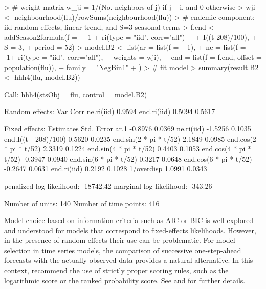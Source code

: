\documentclass[a4paper,11pt]{article}
\begin{document}
\begin{Schunk}
\begin{Sinput}
> # weight matrix w_ji = 1/(No. neighbors of j) if j ~ i, and 0 otherwise
> wji <- neighbourhood(flu)/rowSums(neighbourhood(flu))
> # endemic component: iid random effects, linear trend, and S=3 seasonal terms
> f.end <- addSeason2formula(f = ~ -1 + ri(type = "iid", corr="all") + 
+                                 I((t-208)/100), 
+                                 S = 3, 
+                                 period = 52)
> model.B2 <- list(ar = list(f = ~ 1),
+                  ne = list(f = ~ -1+ ri(type = "iid", corr="all"), 
+                            weights = wji),
+                  end = list(f = f.end, offset = population(flu)),
+                  family = "NegBin1"
+                  )
> # fit model
> summary(result.B2 <- hhh4(flu, model.B2))
\end{Sinput}
\end{Schunk}
\begin{Schunk}
\begin{Soutput}
Call: 
hhh4(stsObj = flu, control = model.B2)

Random effects: 
            Var    Corr   
ne.ri(iid)  0.9594        
end.ri(iid) 0.5094 0.5617 

Fixed effects: 
                        Estimates  Std. Error
ar.1                      -0.8976      0.0369
ne.ri(iid)                -1.5256      0.1035
end.I((t - 208)/100)       0.5620      0.0235
end.sin(2 * pi * t/52)     2.1849      0.0985
end.cos(2 * pi * t/52)     2.3319      0.1224
end.sin(4 * pi * t/52)     0.4403      0.1053
end.cos(4 * pi * t/52)    -0.3947      0.0940
end.sin(6 * pi * t/52)     0.3217      0.0648
end.cos(6 * pi * t/52)    -0.2647      0.0631
end.ri(iid)                0.2192      0.1028
1/overdisp                 1.0991      0.0343

penalized log-likelihood:  -18742.42 
marginal log-likelihood:   -343.26 

Number of units:          140 
Number of time points:    416 
\end{Soutput}
\end{Schunk}
Model choice based on information criteria such as AIC or BIC is well
explored and understood for models that correspond to fixed-effects likelihoods.
However, in the presence of random effects their use can be problematic.
For model selection in time series models, the comparison of successive 
one-step-ahead forecasts with the actually observed data 
provides a natural alternative. In this context, \cite{gneiting-raftery-2007}
recommend the use of strictly proper scoring 
rules, such as the logarithmic score or the ranked probability score.
See \cite{czado-etal-2009} and \cite{paul-held-2011} for further details.
\end{document}
